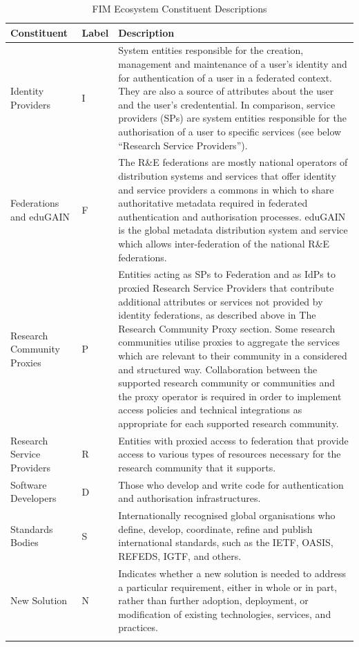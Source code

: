 \documentclass[fleqn,11pt]{wlscirep}
\begin{document}
{\begin{center}
\begin{longtable}{|p{3cm}|p{1cm}|p{10cm}|} 
\hline
Constituent
&Label
&Description \\
\hline\hline
\endhead
Identity Providers
&I
&System entities responsible for the creation, management and maintenance of a user’s identity and for authentication of a user in a federated context. They are also a source of attributes about the user and the user’s credentential. In comparison, service providers (SPs) are system entities responsible for the authorisation of a user to specific services (see below “Research Service Providers”).\\
\hline
Federations and eduGAIN
&F
&The R\&E federations are mostly national operators of distribution systems and services that offer identity and service providers a commons in which to share authoritative metadata required in federated authentication and authorisation processes. eduGAIN is the global metadata distribution system and service which allows inter-federation of the national R\&E federations. \\
\hline
Research Community Proxies
&P
&Entities acting as SPs to Federation and as IdPs to proxied Research Service Providers that contribute additional attributes or services not provided by identity federations, as described above in The Research Community Proxy section. Some research communities utilise proxies to aggregate the services which are relevant to their community in a considered and structured way. Collaboration between the supported research community or communities and the proxy operator is required in order to implement access policies and technical integrations as appropriate for each supported research community. \\
\hline
Research Service Providers
&R
&Entities with proxied access to federation that provide access to various types of resources necessary for the research community that it supports.\\
\hline
Software Developers
&D
&Those who develop and write code for authentication and authorisation infrastructures. \\
\hline
Standards Bodies
&S
&Internationally recognised global organisations who define, develop, coordinate, refine and publish international standards, such as the IETF, OASIS, REFEDS, IGTF, and others.\\
\hline
New Solution
&N
&Indicates whether a new solution is needed to address a particular requirement, either in whole or in part, rather than further adoption, deployment, or modification of existing technologies, services, and practices.\\
 \hline
\caption{FIM Ecosystem Constituent Descriptions}
\label{tab:ecosystem}
\end{longtable}
\end{center}

}
\end{document}

